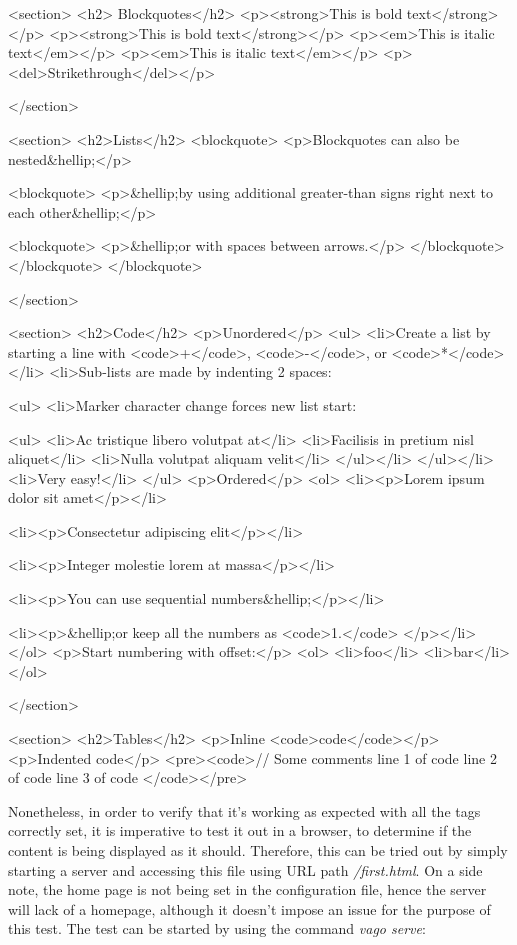 \begin{code}
<section>
<h2>
    Blockquotes</h2>
    <p><strong>This is bold text</strong></p>
    <p><strong>This is bold text</strong></p>
    <p><em>This is italic text</em></p>
    <p><em>This is italic text</em></p>
    <p><del>Strikethrough</del></p>

    </section>



    <section>
    <h2>Lists</h2>
    <blockquote>
    <p>Blockquotes can also be nested&hellip;</p>

    <blockquote>
    <p>&hellip;by using additional greater-than signs right
    next to each other&hellip;</p>

    <blockquote>
    <p>&hellip;or with spaces between arrows.</p>
    </blockquote>
    </blockquote>
    </blockquote>

    </section>



    <section>
    <h2>Code</h2>
    <p>Unordered</p>
    <ul>
    <li>Create a list by starting a line with <code>+</code>,
    <code>-</code>, or <code>*</code></li>
    <li>Sub-lists are made by indenting 2 spaces:

    <ul>
    <li>Marker character change forces new list start:

    <ul>
    <li>Ac tristique libero volutpat at</li>
    <li>Facilisis in pretium nisl aliquet</li>
    <li>Nulla volutpat aliquam velit</li>
    </ul></li>
    </ul></li>
    <li>Very easy!</li>
    </ul>
    <p>Ordered</p>
    <ol>
    <li><p>Lorem ipsum dolor sit amet</p></li>

    <li><p>Consectetur adipiscing elit</p></li>

    <li><p>Integer molestie lorem at massa</p></li>

    <li><p>You can use sequential numbers&hellip;</p></li>

    <li><p>&hellip;or keep all the numbers as <code>1.</code>
    </p></li>
    </ol>
    <p>Start numbering with offset:</p>
    <ol>
    <li>foo</li>
    <li>bar</li>
    </ol>

    </section>



    <section>
    <h2>Tables</h2>
    <p>Inline <code>code</code></p>
    <p>Indented code</p>
    <pre><code>// Some comments
    line 1 of code
    line 2 of code
    line 3 of code
    </code></pre>
\end{code}


Nonetheless, in order to verify that it's working as expected with all the tags correctly set, it is imperative to test
it out in a browser, to determine if the content is being displayed as it should.
Therefore, this can be tried out by simply starting a server and accessing this file using URL path \emph{/first.html}.
On a side note, the home page is not being set in the configuration file, hence the server will lack of a homepage,
although it doesn't impose an issue for the purpose of this test.
The test can be started by using the command \emph{vago serve}:

